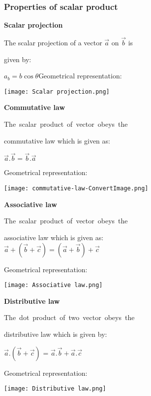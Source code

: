 \documentclass[11pt]{article}
\begin{document}
\subsubsection{Properties of scalar product}
\begin{multicols}{2}
\textbf{Scalar projection}


The scalar projection of a vector 
$\overrightarrow{a}$ on $\overrightarrow{b}$ is


\vspace{-1cm}
given by:


\vspace{-0.5cm}$a_b=b\cos\theta$\hfill\break Geometrical representation:



\vspace{.5cm}
\texttt{[image: Scalar projection.png]}



\vspace{.5cm}
\textbf{Commutative law}


\mbox{The scalar product of vector obeys the}


commutative law which is given as:


$\overrightarrow{a}.\overrightarrow{b}=\overrightarrow{b}.\overrightarrow{a}$


Geometrical representation:


\vspace{.5cm}
\texttt{[image: commutative-law-ConvertImage.png]}


\vspace{8cm}
\textbf{Associative law}


\vspace{.9cm}
\mbox{The scalar product of vector obeys the}


associative law which is given as:\\
$\overrightarrow{a}+(\overrightarrow{b}+\overrightarrow{c})=(\overrightarrow{a}+\overrightarrow{b})+\overrightarrow{c}$


Geometrical representation:


\vspace{.4cm}
\texttt{[image: Associative law.png]}


\vspace{2.5cm}
\textbf{Distributive law}


\mbox{The dot product of two vector obeys the}


distributive law which is given by:


$\overrightarrow{a}.(\overrightarrow{b}+\overrightarrow{c})$ = $\overrightarrow{a}.\overrightarrow{b}+\overrightarrow{a}.\overrightarrow{c}$


Geometrical representation:


\vspace{.5cm}
\texttt{[image: Distributive law.png]}
\end{multicols}
\newpage
\end{document}
